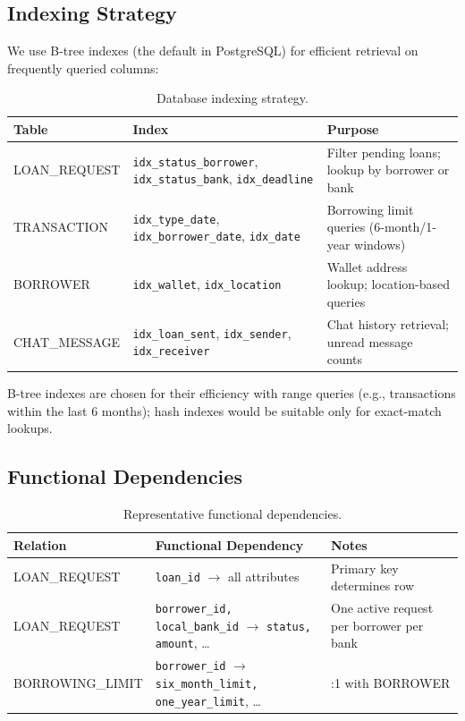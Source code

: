 \documentclass[12pt,a4paper]{report}
\newcommand{\tableheadfont}{\bfseries\small\color{PrimaryBlue}}
\newenvironment{moderntable}[1][H]{%
    \begin{table}[#1]\centering\small%
    \renewcommand{\arraystretch}{1.35}%
}{%
    \end{table}%
}
\begin{document}
\subsection{Indexing Strategy}

We use B-tree indexes (the default in PostgreSQL) for efficient retrieval on frequently queried columns:

\begin{moderntable}
\caption{Database indexing strategy.}
\begin{tabular}{@{} >{\raggedright}p{3cm} >{\raggedright}p{4.5cm} >{\raggedright\arraybackslash}p{4.5cm} @{}}
\toprule
\tableheadfont Table & \tableheadfont Index & \tableheadfont Purpose \\
\midrule
\rowcolor{RowShade}
LOAN\_REQUEST & \texttt{idx\_status\_borrower}, \texttt{idx\_status\_bank}, \texttt{idx\_deadline} & Filter pending loans; lookup by borrower or bank \\
TRANSACTION & \texttt{idx\_type\_date}, \texttt{idx\_borrower\_date}, \texttt{idx\_date} & Borrowing limit queries (6-month/1-year windows) \\
\rowcolor{RowShade}
BORROWER & \texttt{idx\_wallet}, \texttt{idx\_location} & Wallet address lookup; location-based queries \\
CHAT\_MESSAGE & \texttt{idx\_loan\_sent}, \texttt{idx\_sender}, \texttt{idx\_receiver} & Chat history retrieval; unread message counts \\
\bottomrule
\end{tabular}
\end{moderntable}

B-tree indexes are chosen for their efficiency with range queries (e.g., transactions within the last 6 months); hash indexes would be suitable only for exact-match lookups.

\subsection{Functional Dependencies}

\begin{moderntable}
\caption{Representative functional dependencies.}
\begin{tabular}{@{} >{\raggedright}p{3cm} >{\raggedright}p{5cm} >{\raggedright\arraybackslash}p{4cm} @{}}
\toprule
\tableheadfont Relation & \tableheadfont Functional Dependency & \tableheadfont Notes \\
\midrule
\rowcolor{RowShade}
LOAN\_REQUEST & \texttt{loan\_id} $\to$ all attributes & Primary key determines row \\
LOAN\_REQUEST & \texttt{borrower\_id, local\_bank\_id} $\to$ \texttt{status, amount}, \ldots & One active request per borrower per bank \\
\rowcolor{RowShade}
BORROWING\_LIMIT & \texttt{borrower\_id} $\to$ \texttt{six\_month\_limit, one\_year\_limit}, \ldots & 1:1 with BORROWER \\
\bottomrule
\end{tabular}
\end{moderntable}
\end{document}
